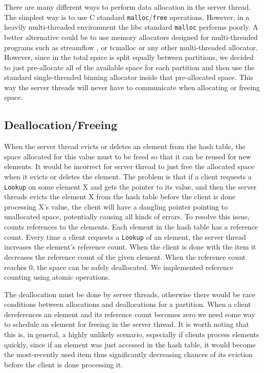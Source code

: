 There are many different ways to perform data allocation in the server thread. The simplest way is to use C standard 
\texttt{malloc}/\texttt{free} operations. However, in a heavily multi-threaded environment the libc standard \texttt{malloc} performs poorly. 
A better alternative could be to use memory allocators designed for multi-threaded programs such as streamflow \cite{streamflow}, 
or tcmalloc \cite{tcmalloc} or any other multi-threaded allocator. However, since in \cphash{} the total space is split equally 
between partitions, we decided to just pre-allocate all of the available space for each partition and then use the standard
single-threaded binning allocator \cite{binallocator} inside that pre-allocated space. This way the server threads will never have to communicate when 
allocating or freeing space. 

\subsection{Deallocation/Freeing}

When the server thread evicts or deletes an element from the hash table, the space allocated for this value must to be 
freed so that it can be reused for new elements. It would be incorrect for server thread to just free the allocated space when it evicts or deletes 
the element. The problem is that if a client requests a \texttt{Lookup} on some element X and gets the pointer to its value, 
and then the server threads evicts the element X from the hash table before the client is done processing X's value, the client will have a dangling 
pointer pointing to unallocated space, potentially causing all kinds of errors. To resolve this issue, \cphash{} counts references to the elements. 
Each element in the hash table has a reference count. Every time a client requests a \texttt{Lookup} of an element, the server thread increases the element's 
reference count. When the client is done with the item it decreases the reference count of the given element. When the reference count reaches 0, 
the space can be safely deallocated. We implemented reference counting using atomic operations.

The deallocation must be done by server threads, otherwise there would be race conditions between allocations 
and deallocations for a partition. When a client dereferences an element and its reference count becomes zero we need 
some way to schedule an element for freeing in the server thread. It is worth noting that this is, in general, a highly unlikely 
scenario, especially if clients process elements quickly, since if an element was just accessed in the hash table, it 
would become the most-recently used item thus significantly decreasing chances of its eviction before the client is done processing it.

